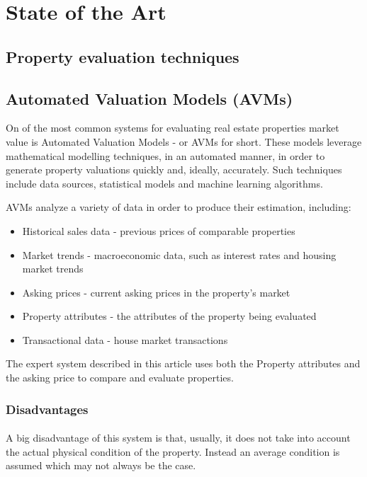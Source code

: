 \documentclass[runningheads]{llncs}
\begin{document}
\section{State of the Art}

\subsection{Property evaluation techniques}



\subsection{Automated Valuation Models (AVMs)}

On of the most common systems for evaluating real estate properties market value is Automated Valuation Models - or AVMs for short. These models leverage mathematical modelling techniques, in an automated manner, in order to generate property valuations quickly and, ideally, accurately. Such techniques include data sources, statistical models and machine learning algorithms.

AVMs analyze a variety of data in order to produce their estimation, including:
\begin{itemize}
    \item Historical sales data - previous prices of comparable properties
    \item Market trends - macroeconomic data, such as interest rates and housing market trends
    \item Asking prices - current asking prices in the property's market
    \item Property attributes - the attributes of the property being evaluated
    \item Transactional data - house market transactions
\end{itemize}

The expert system described in this article uses both the Property attributes and the asking price to compare and evaluate properties.

\subsubsection{Disadvantages}
\paragraph{}
A big disadvantage of this system is that, usually, it does not take into account the actual physical condition of the property. Instead an average condition is assumed which may not always be the case.
\end{document}

